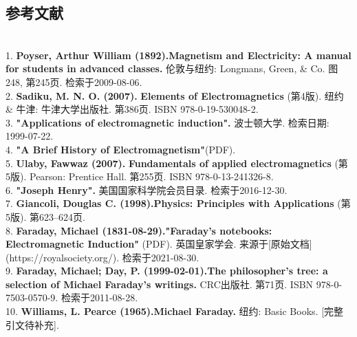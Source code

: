\subsection{参考文献}\\
1. \textbf{Poyser, Arthur William (1892).}\textbf{Magnetism and Electricity: A manual for students in advanced classes.} 伦敦与纽约: Longmans, Green, & Co. 图248, 第245页. 检索于2009-08-06.\\
2. \textbf{Sadiku, M. N. O. (2007).} \textbf{Elements of Electromagnetics} (第4版). 纽约 & 牛津: 牛津大学出版社. 第386页. ISBN 978-0-19-530048-2.\\
3. \textbf{"Applications of electromagnetic induction".} 波士顿大学. 检索日期: 1999-07-22.\\
4. \textbf{"A Brief History of Electromagnetism"}(PDF).\\
5. \textbf{Ulaby, Fawwaz (2007).} \textbf{Fundamentals of applied electromagnetics} (第5版). Pearson: Prentice Hall. 第255页. ISBN 978-0-13-241326-8.\\
6. \textbf{"Joseph Henry".} 美国国家科学院会员目录. 检索于2016-12-30.\\
7. \textbf{Giancoli, Douglas C. (1998).}\textbf{Physics: Principles with Applications} (第5版). 第623–624页.\\
8. \textbf{Faraday, Michael (1831-08-29).}\textbf{"Faraday's notebooks: Electromagnetic Induction"} (PDF). 英国皇家学会. 来源于[原始文档](https://royalsociety.org/). 检索于2021-08-30.\\
9. \textbf{Faraday, Michael; Day, P. (1999-02-01).}\textbf{The philosopher's tree: a selection of Michael Faraday's writings.} CRC出版社. 第71页. ISBN 978-0-7503-0570-9. 检索于2011-08-28.\\
10. \textbf{Williams, L. Pearce (1965).}\textbf{Michael Faraday.} 纽约: Basic Books. [完整引文待补充].\\